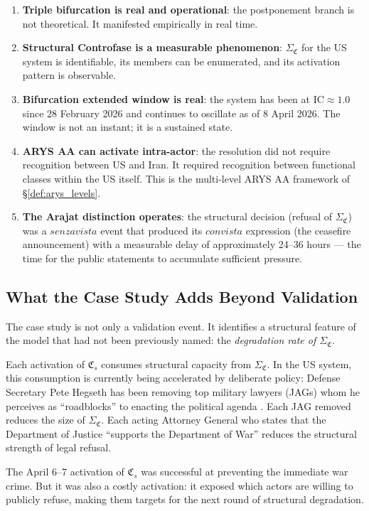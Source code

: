 \documentclass[12pt,a4paper]{article}
\newcommand{\IC}{\mathrm{IC}}
\newcommand{\CFs}{\mathfrak{C}_s}        %
\newcommand{\SigmaCF}{\Sigma_{\mathfrak{C}}}  %
\begin{document}
\begin{enumerate}[leftmargin=2em]
    \item \textbf{Triple bifurcation is real and operational}: the postponement branch is not theoretical. It manifested empirically in real time.
    \item \textbf{Structural Controfase is a measurable phenomenon}: $\SigmaCF$ for the US system is identifiable, its members can be enumerated, and its activation pattern is observable.
    \item \textbf{Bifurcation extended window is real}: the system has been at $\IC \approx 1.0$ since 28 February 2026 and continues to oscillate as of 8 April 2026. The window is not an instant; it is a sustained state.
    \item \textbf{ARYS AA can activate intra-actor}: the resolution did not require recognition between US and Iran. It required recognition between functional classes within the US itself. This is the multi-level ARYS AA framework of \S\ref{def:arys_levels}.
    \item \textbf{The Arajat distinction operates}: the structural decision (refusal of $\SigmaCF$) was a $senza vista$ event that produced its $con vista$ expression (the ceasefire announcement) with a measurable delay of approximately 24--36 hours --- the time for the public statements to accumulate sufficient pressure.
\end{enumerate}

\subsection{What the Case Study Adds Beyond Validation}

The case study is not only a validation event. It identifies a structural feature of the model that had not been previously named: the \emph{degradation rate of $\SigmaCF$}.

Each activation of $\CFs$ consumes structural capacity from $\SigmaCF$. In the US system, this consumption is currently being accelerated by deliberate policy: Defense Secretary Pete Hegseth has been removing top military lawyers (JAGs) whom he perceives as ``roadblocks'' to enacting the political agenda \cite{axios_war_crimes}. Each JAG removed reduces the size of $\SigmaCF$. Each acting Attorney General who states that the Department of Justice ``supports the Department of War'' reduces the structural strength of legal refusal.

The April 6--7 activation of $\CFs$ was successful at preventing the immediate war crime. But it was also a costly activation: it exposed which actors are willing to publicly refuse, making them targets for the next round of structural degradation.
\end{document}
